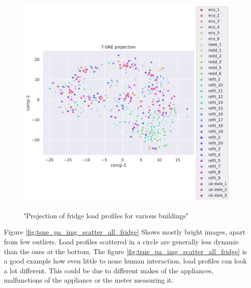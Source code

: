\begin{figure}[H]
	\centering
	\caption{"Projection of fridge load profiles for various buildings"}
	\includegraphics[width=1.2\textwidth]{Figures/TSNE/TSNE_per_appliance/all/scatter_all_fridge_freeezer_fridge freezer.png}
	\label{fig:tsne_pa_scatter_all_fridge}
\end{figure}

Figure \ref{fig:tsne_pa_img_scatter_all_fridge} Shows mostly bright images, apart from few outliers.
Load profiles scattered in a circle are generally less dynamic than the ones at the bottom.
The figure \ref{fig:tsne_pa_img_scatter_all_fridge} is a good example how even little to none human
interaction, load profiles can look a lot different. This could be due to different makes of the 
appliances, malfunctions of the appliance or the meter measuring it.

